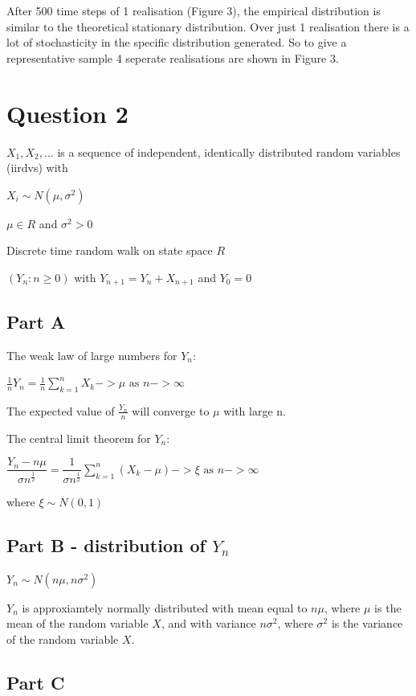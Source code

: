 \documentclass{article}
\begin{document}
After 500 time steps of 1 realisation (Figure 3), the empirical distribution is similar to the theoretical stationary distribution. Over just 1 realisation there is a lot of stochasticity in the specific distribution generated. So to give a representative sample 4 seperate realisations are shown in Figure 3.


\section{Question 2}

$X_1, X_2, ... $ is a sequence of independent, identically distributed random variables (iirdvs) with 

$X_i \sim N(\mu, \sigma^2)$ 

$\mu \in {R}$ and $\sigma^2 > 0$

Discrete time random walk on state space ${R}$

$(Y_n : n \geq 0)$ with $Y_{n+1} = Y_n + X_{n+1}$ and $Y_0 = 0$


\subsection{Part A}

The weak law of large numbers for $Y_n$:

$\frac{1}{n}Y_n = \frac{1}{n}\sum\limits_{k=1}^n X_k -> \mu \text{ as } n -> \infty$

The expected value of $\frac{Y_n}{n}$ will converge to $\mu$ with large n.

\bigskip
The central limit theorem for $Y_n$:

$\dfrac{Y_n - n\mu}{\sigma n^\frac{1}{2}} = \dfrac{1}{\sigma n^\frac{1}{2}}\sum\limits_{k=1}^n (X_k - \mu) -> \xi \text{ as } n -> \infty$

where $\xi \sim N(0,1)$

\subsection{Part B - distribution of $Y_n$}

$Y_n \sim N(n\mu, n\sigma^2)$

$Y_n$ is approxiamtely normally distributed with mean equal to $n\mu$, where $\mu$ is the mean of the random variable $X$, and with variance $n\sigma^2$, where $\sigma^2$ is the variance of the random variable $X$. 

\subsection{Part C}
\end{document}
